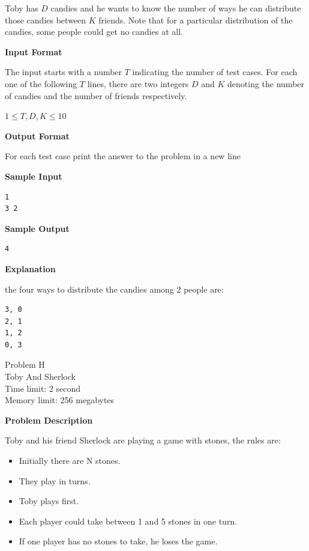 \documentclass[11pt]{article}
\begin{document}
Toby has $D$ candies and he wants to know the number of ways he can distribute
those candies between $K$ friends. Note that for a particular distribution of the
candies, some people could get no candies at all.

\textbf{\large Input Format}

The input starts with a number $T$ indicating the number of test cases. For each one
of the following $T$ lines, there are two integers $D$ and $K$ denoting the number
of candies and the number of friends respectively.

$1 \le T, D, K \le 10$

\textbf{\large Output Format}

For each test case print the answer to the problem in a new line

\textbf{\large Sample Input}

\begin{verbatim}
1
3 2
\end{verbatim}

\textbf{\large Sample Output}

\begin{verbatim}
4
\end{verbatim}

\textbf{\large Explanation}

the four ways to distribute the candies among 2 people are:

\begin{verbatim}
3, 0
2, 1
1, 2
0, 3
\end{verbatim}

\newpage
        \begin{center}
            {\LARGE Problem H}\\
            {\Large Toby And Sherlock}\\
            {Time limit: 2 second}\\
            {Memory limit: 256 megabytes}
        \end{center}\textbf{\large Problem Description}

Toby and his friend Sherlock are playing a game with stones, the rules are:
\begin{itemize}
\item Initially there are N stones.
\item  They play in turns.
\item  Toby plays first.
\item  Each player could take between 1 and 5 stones in one turn.
\item  If one player has no stones to take, he loses the game.
\end{itemize}
\end{document}

